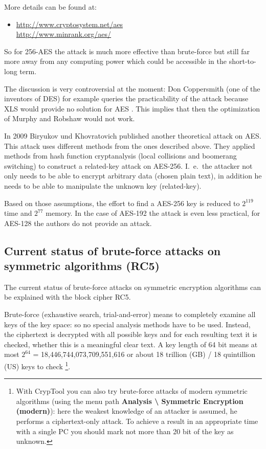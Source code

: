 More details can be found at:
\vspace{-10pt}
\begin{itemize}
  \item[] \url{http://www.cryptosystem.net/aes} \\
          \url{http://www.minrank.org/aes/} 
\end{itemize}

So for 256-AES the attack is much more effective than brute-force but still far more away from any computing power which could be accessible in the short-to-long term. 

The discussion is very controversial at the moment: Don Coppersmith (one of the
inventors of DES) for example queries the practicability of the attack because
XLS would provide no solution for AES \cite{cm:Coppersmith2002}. This implies that
then the optimization of Murphy and Robshaw \cite{cm:Robshaw2002b} would not work.

In 2009 Biryukov und Khovratovich \cite{cm:Biryukov2009} published another
theoretical attack on AES. This attack uses different methods from the ones
described above. They applied methods from hash function cryptanalysis (local
collisions and boomerang switching) to construct a related-key attack on
AES-256. I.~e.\ the attacker not only needs to be able to encrypt arbitrary data
(chosen plain text), in addition he needs to be able to manipulate the unknown key
(related-key). 

Based on those assumptions, the effort to find a AES-256 key is reduced to
$2^{119}$ time and $2^{77}$ memory. In the case of AES-192 the attack is even less
practical, for AES-128 the authors do not provide an attack.


\subsection{Current status of brute-force attacks on symmetric algorithms (RC5)}
\label{Brute-force-gegen-Symmetr}

The current status of brute-force attacks on symmetric encryption algorithms can be explained with the block cipher RC5.

Brute-force (exhaustive search, trial-and-error) means to completely examine all keys of the key space: so no special analysis methods have to be used. Instead, the ciphertext is decrypted with all possible keys and for each resulting text it is checked, whether this is a meaningful clear text. A key length of 64 bit means at most $2^{64}$ = 18,446,744,073,709,551,616 or about 18 trillion (GB) / 18 quintillion (US)  keys to check%
\footnote{%
    With CrypTool you can also try brute-force attacks
    of modern symmetric algorithms (using the menu path
    {\bf Analysis \textbackslash{} Symmetric Encryption (modern)}): here
    the weakest knowledge of an attacker is assumed, he performs a 
    ciphertext-only attack.
    To achieve a result in an appropriate time with a single PC you should 
    mark not more than 20 bit of the key as unknown.
}.

